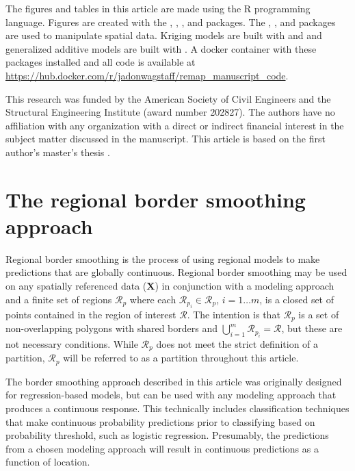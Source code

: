 The figures and tables in this article are made using the R programming language. Figures are created with the  \citep{wickham2019},  \citep{auguie2017},  \citep{wilke2020}, and  \citep{becker2018} packages. The  \citep{pebesma2018},  \citep{dorman2020}, and  \citep{hijmans2020} packages are used to manipulate spatial data. Kriging models are built with  \citep{hiemstra2009} and  \citep{pebesma2004, graler2016} and generalized additive models are built with  \citep{wood2011}. A docker container with these packages installed and all code is available at \url{https://hub.docker.com/r/jadonwagstaff/remap_manuscript_code}.

This research was funded by the American Society of Civil Engineers and the Structural Engineering Institute (award number 202827). The authors have no affiliation with any organization with a direct or indirect financial interest in the subject matter discussed in the manuscript. This article is based on the first author's master's thesis \citep{jwthesis}.


\section{The regional border smoothing approach}

Regional border smoothing is the process of using regional models to make predictions that are globally continuous. Regional border smoothing may be used on any spatially referenced data ($\pmb{X}$) in conjunction with a modeling approach and a finite set of regions $\mathcal{R}_p$ where each $\mathcal{R}_{p_i} \in \mathcal{R}_p$, $i = 1 \dots m$, is a closed set of points contained in the region of interest $\mathcal{R}$. The intention is that $\mathcal{R}_p$ is a set of non-overlapping polygons with shared borders and $\bigcup\limits_{i=1}^m \mathcal{R}_{p_i} = \mathcal{R}$, but these are not necessary conditions. While $\mathcal{R}_p$ does not meet the strict definition of a partition, $\mathcal{R}_p$ will be referred to as a partition throughout this article.

The border smoothing approach described in this article was originally designed for regression-based models, but can be used with any modeling approach that produces a continuous response. This technically includes classification techniques that make continuous probability predictions prior to classifying based on probability threshold, such as logistic regression. Presumably, the predictions from a chosen modeling approach will result in continuous predictions as a function of location.

